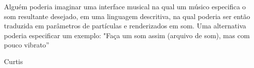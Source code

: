 \documentclass[
	12pt,				%
	openright,			%
	twoside,			%
	a4paper,			%
	english,			%
	french,				%
	spanish,			%
        italian,                        %
	brazil				%
	]{abntex2}
\begin{document}
\frenchspacing 

\pretextual

\imprimircapa

\imprimirfolhaderosto*

%


% 
%






\epigraph{Alguém poderia imaginar uma interface musical na qual um músico especifica o som resultante desejado, em uma linguagem descritiva, na qual poderia ser então traduzida em parâmetros de partículas e renderizados em som. Uma alternativa poderia especificar um exemplo: "Faça um som assim (arquivo de som), mas com pouco vibrato''}{Curtis }
\newpage


%
\tableofcontents*
\cleardoublepage
\textual



\end{document}
